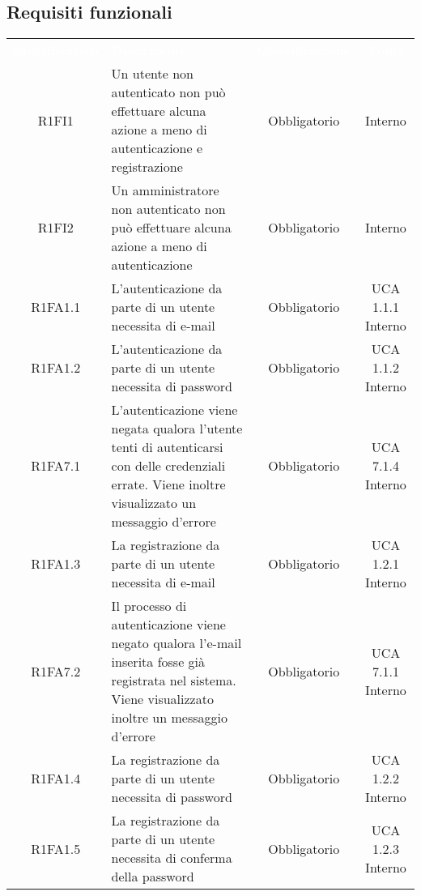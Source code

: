 \renewcommand{\o}{Obbligatorio}
\renewcommand{\d}{Desiderabile}
\newcommand{\op}{Opzionale}
\subsection{Requisiti funzionali}
{
\renewcommand{\arraystretch}{1.5}
\centering
\begin{longtable}{ c C{4cm} c c}
\textcolor{white}{\textbf{Identificativo}} & \textcolor{white}{\textbf{Descrizione}} & \textcolor{white}{\textbf{Classificazione}} & \textcolor{white}{\textbf{Fonti}}\\	

R1FI1 & Un utente non autenticato non può effettuare alcuna azione a meno di autenticazione e registrazione & Obbligatorio & Interno\\

R1FI2 & Un amministratore non autenticato non può effettuare alcuna azione a meno di autenticazione & Obbligatorio & Interno\\

R1FA1.1 & L'autenticazione da parte di un utente necessita di e-mail & Obbligatorio & UCA 1.1.1 Interno\\

R1FA1.2 & L'autenticazione da parte di un utente necessita di password & Obbligatorio & UCA 1.1.2 Interno\\

R1FA7.1 & L'autenticazione viene negata qualora l'utente tenti di autenticarsi con delle credenziali errate. Viene inoltre visualizzato un messaggio d'errore & Obbligatorio & UCA 7.1.4 Interno\\

R1FA1.3 & La registrazione da parte di un utente necessita di e-mail & Obbligatorio & UCA 1.2.1 Interno\\

R1FA7.2 & Il processo di autenticazione viene negato qualora l'e-mail inserita fosse già registrata nel sistema. Viene visualizzato inoltre un messaggio d'errore & Obbligatorio & UCA 7.1.1 Interno\\

R1FA1.4 & La registrazione da parte di un utente necessita di password & Obbligatorio & UCA 1.2.2 Interno\\

R1FA1.5 & La registrazione da parte di un utente necessita di conferma della password & Obbligatorio & UCA 1.2.3 Interno\\


\end{longtable}}

